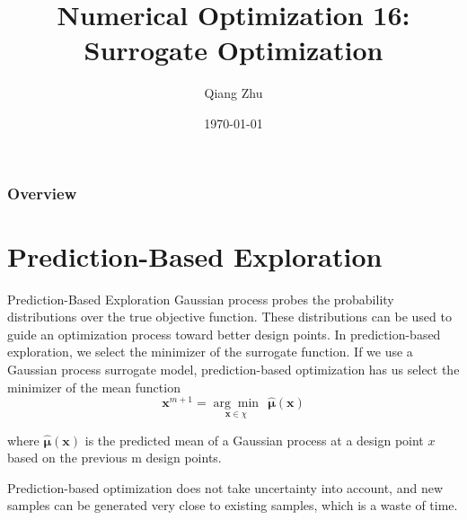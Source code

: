 \documentclass{beamer}
\title[Surrogate Optimization]{Numerical Optimization 16: Surrogate Optimization} %
\author{Qiang Zhu} %
\institute[University of Nevada Las Vegas] %
{
University of Nevada Las Vegas\\ %
\medskip
}
\date{\today} %
\begin{document}
\begin{frame}
\titlepage %
\end{frame}

\begin{frame}
\frametitle{Overview} %
\tableofcontents %
\end{frame}



\section{Prediction-Based Exploration}
\begin{frame}{Prediction-Based Exploration}
Gaussian process probes the probability distributions over the true objective function. These distributions can be used to guide an optimization process toward better design points. In prediction-based exploration, we select the minimizer of the surrogate function. If we use a Gaussian process surrogate model, prediction-based optimization has us select the minimizer of the mean function
\begin{equation*}
    \boldsymbol{x}^{m+1} = \underset{\boldsymbol{x}\in \chi}{\arg\min}~~ \hat{\boldsymbol{\mu}}(\boldsymbol{x})
\end{equation*}

where $\hat{\boldsymbol{\mu}}(\boldsymbol{x})$ is the predicted mean of a Gaussian process at a design point $x$ based on the previous m design points. 

Prediction-based optimization does not take uncertainty into account, and new samples can be generated very close to existing samples, which is a waste of time.
\end{frame}
\end{document}
